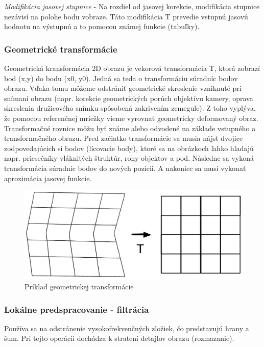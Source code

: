 \textit{Modifikácia jasovej stupnice} - Na rozdiel od jasovej korekcie, modifikácia stupnice nezávisí na polohe bodu vobraze. Táto modifikácia T prevedie vstupnú jasovú hodnotu na výstupnú a to pomocou známej funkcie (tabuľky). 


\subsubsection{Geometrické transformácie}
Geometrická kransformácia 2D obrazu je vekorová transformácia T, ktorá zobrazí bod (x,y) do bodu (x0, y0).  Jedná sa teda o transformáciu súradníc bodov obrazu. Vďaka tomu môžeme odstrániť geometrické skreslenie vzniknuté pri snímaní obrazu (napr. korekcie geometrických porúch objektívu kamery, oprava skreslenia družicového snímku spôsobená zakrivením zemegule).  Z toho vyplýva, že pomocou referenčnej mriežky vieme vyrovnať geometricky deformovaný obraz. Transformačné rovnice môžu byť známe alebo odvodené na základe vstupného a transformačného  obrazu. Pred začiatko transformácie sa musia nájsť dvojice zodpovedajúcich si bodov (lícovacie body), ktoré sa na obrázkoch ľahko hľadajú napr. priesečníky vláknitých štruktúr, rohy objektov a pod. Následne sa vykoná transformácia súradníc bodov do nových pozícii. A nakoniec sa musí vykonať aproximácia jasovej funkcie.

\begin{figure}[H]
\begin{center}
	\includegraphics[scale=0.4]{obrazky/geometrickaTransformacia}
	\caption{Príklad geometrickej transformácie}
	\end{center}
\end{figure}

\subsubsection{Lokálne predspracovanie - filtrácia}
Používa sa na odstránenie vysokofrekvenčných zložiek, čo predstavujú hrany a šum. Pri tejto operácii dochádza k stratení detajlov obrazu (rozmazanie).

